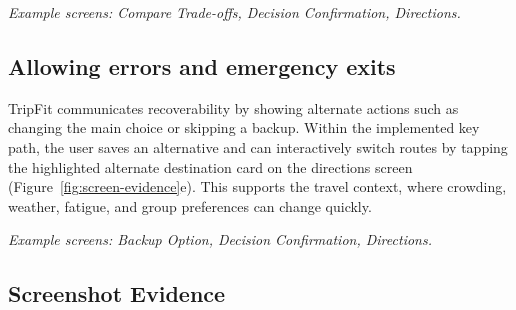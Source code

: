 \documentclass[11pt,a4paper]{article}
\begin{document}
\textit{Example screens: Compare Trade-offs, Decision Confirmation, Directions.}

\subsection{Allowing errors and emergency exits}

TripFit communicates recoverability by showing alternate actions such as changing the main choice or skipping a backup. Within the implemented key path, the user saves an alternative and can interactively switch routes by tapping the highlighted alternate destination card on the directions screen (Figure~\ref{fig:screen-evidence}e). This supports the travel context, where crowding, weather, fatigue, and group preferences can change quickly.

\textit{Example screens: Backup Option, Decision Confirmation, Directions.}

\clearpage
\subsection{Screenshot Evidence}
\end{document}

